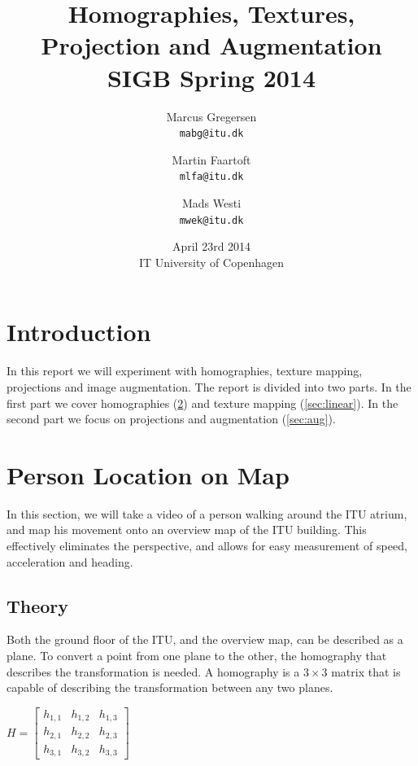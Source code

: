 \documentclass[a4paper,11pt]{article}
\begin{document}
\date{April 23rd 2014\\ IT University of Copenhagen}
\title{Homographies, Textures, Projection and Augmentation\\SIGB Spring 2014}

\author{Marcus Gregersen\\
\texttt{mabg@itu.dk}
\and Martin Faartoft\\
\texttt{mlfa@itu.dk}
\and Mads Westi\\
\texttt{mwek@itu.dk}}
\clearpage\maketitle
\thispagestyle{empty}
\setcounter{page}{1}
\newpage

\section{Introduction}
In this report we will experiment with homographies, texture mapping, projections and image augmentation. The report is divided into two parts. In the first part we cover homographies (\ref{sec:person}) and texture mapping (\ref{sec:linear}). In the second part we focus on projections and augmentation (\ref{sec:aug}).

\section{Person Location on Map}
\label{sec:person}
In this section, we will take a video of a person walking around the ITU atrium, and map his movement onto an overview map of the ITU building. This effectively eliminates the perspective, and allows for easy measurement of speed, acceleration and heading.

\subsection{Theory}
Both the ground floor of the ITU, and the overview map, can be described as a plane. To convert a point from one plane to the other, the homography that describes the transformation is needed. A homography is a $3 \times 3$ matrix that is capable of describing the transformation between any two planes.
\begin{center}
$H =
\begin{bmatrix}
 h_{1,1} & h_{1,2} & h_{1,3} \\
 h_{2,1} & h_{2,2} & h_{2,3} \\
 h_{3,1} & h_{3,2} & h_{3,3}
\end{bmatrix}
$
\end{center}
\end{document}
